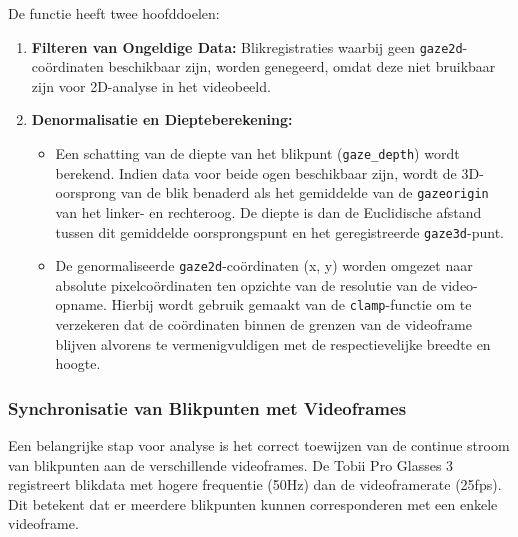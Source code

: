 De functie heeft twee hoofddoelen:
\begin{enumerate}
  \item \textbf{Filteren van Ongeldige Data:} Blikregistraties waarbij geen \texttt{gaze2d}-coördinaten beschikbaar zijn, 
  worden genegeerd, omdat deze niet bruikbaar zijn voor 2D-analyse in het videobeeld.
  \item \textbf{Denormalisatie en Diepteberekening:}
    \begin{itemize}
      \item Een schatting van de diepte van het blikpunt (\texttt{gaze\_depth}) wordt berekend. 
        Indien data voor beide ogen beschikbaar zijn, wordt de 3D-oorsprong van de blik benaderd als 
        het gemiddelde van de \texttt{gazeorigin} van het linker- en rechteroog. 
        De diepte is dan de Euclidische afstand tussen dit gemiddelde oorsprongspunt en het geregistreerde \texttt{gaze3d}-punt.
      \item De genormaliseerde \texttt{gaze2d}-coördinaten (x, y) worden omgezet naar absolute pixelcoördinaten 
        ten opzichte van de resolutie van de video-opname. 
        Hierbij wordt gebruik gemaakt van de \texttt{clamp}-functie om te verzekeren dat de coördinaten 
        binnen de grenzen van de videoframe blijven alvorens te vermenigvuldigen met de respectievelijke breedte en hoogte.
    \end{itemize}
\end{enumerate}

\subsubsection{Synchronisatie van Blikpunten met Videoframes}

Een belangrijke stap voor analyse is het correct toewijzen van de continue stroom van blikpunten aan de verschillende videoframes.
De Tobii Pro Glasses 3 registreert blikdata met hogere frequentie (50Hz) dan de videoframerate (25fps).
Dit betekent dat er meerdere blikpunten kunnen corresponderen met een enkele videoframe.

